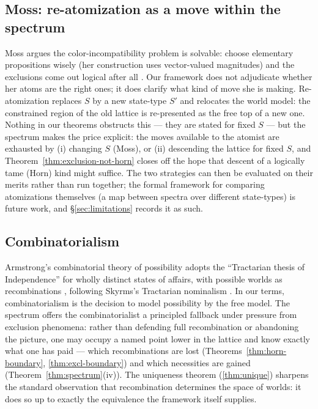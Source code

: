 \documentclass[10pt, letterpaper]{article}
\theoremstyle{remark}
\begin{document}
\subsection{Moss: re-atomization as a move within the spectrum}

Moss argues the color-incompatibility problem is solvable: choose elementary
propositions wisely (her construction uses vector-valued magnitudes) and the
exclusions come out logical after all \cite{moss2012}. Our framework does not
adjudicate whether her atoms are the right ones; it does clarify what kind of
move she is making. Re-atomization replaces $S$ by a new state-type $S'$ and
relocates the world model: the constrained region of the old lattice is
re-presented as the free top of a new one. Nothing in our theorems obstructs
this --- they are stated for fixed $S$ --- but the spectrum makes the price
explicit: the moves available to the atomist are exhausted by (i) changing
$S$ (Moss), or (ii) descending the lattice for fixed $S$, and
Theorem~\ref{thm:exclusion-not-horn} closes off the hope that descent of a
logically tame (Horn) kind might suffice. The two strategies can then be
evaluated on their merits rather than run together; the formal framework for
comparing atomizations themselves (a map between spectra over different
state-types) is future work, and \S\ref{sec:limitations} records it as such.

\subsection{Combinatorialism}

Armstrong's combinatorial theory of possibility adopts the ``Tractarian
thesis of Independence'' for wholly distinct states of affairs, with
possible worlds as recombinations \cite{armstrong1989}, following Skyrms's
Tractarian nominalism \cite{skyrms1981}. In our terms, combinatorialism is
the decision to model possibility by the free model. The spectrum offers the
combinatorialist a principled fallback under pressure from exclusion
phenomena: rather than defending full recombination or abandoning the
picture, one may occupy a named point lower in the lattice and know exactly
what one has paid --- which recombinations are lost
(Theorems~\ref{thm:horn-boundary}, \ref{thm:excl-boundary}) and which
necessities are gained (Theorem~\ref{thm:spectrum}(iv)). The uniqueness
theorem (\ref{thm:unique}) sharpens the standard observation that
recombination determines the space of worlds: it does so up to exactly the
equivalence the framework itself supplies.
\end{document}

